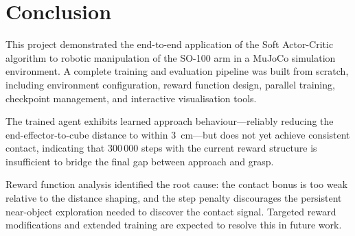 \documentclass[conference]{IEEEtran}
\begin{document}
\section{Conclusion}
\label{sec:conclusion}

This project demonstrated the end-to-end application of the
Soft Actor-Critic algorithm to robotic manipulation of the SO-100
arm in a MuJoCo simulation environment.
A complete training and evaluation pipeline was built from scratch,
including environment configuration, reward function design,
parallel training, checkpoint management, and interactive
visualisation tools.

The trained agent exhibits learned approach behaviour—reliably
reducing the end-effector-to-cube distance to within 3~cm—but does
not yet achieve consistent contact, indicating that 300\,000 steps
with the current reward structure is insufficient to bridge the
final gap between approach and grasp.

Reward function analysis identified the root cause: the contact
bonus is too weak relative to the distance shaping, and the step
penalty discourages the persistent near-object exploration needed
to discover the contact signal.
Targeted reward modifications and extended training are expected
to resolve this in future work.




% 

\end{document}
